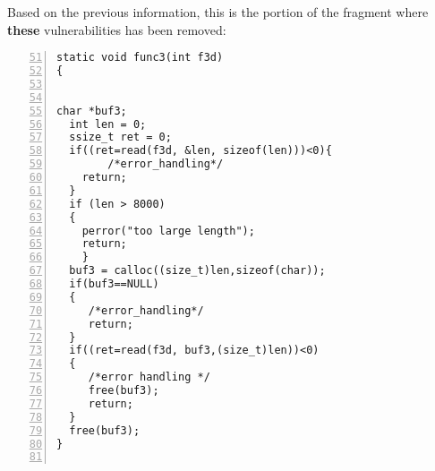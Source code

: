 \documentclass[a4paper,12pt]{article}
\begin{document}
\newpage
\noindent
Based on the previous information, this is the portion of the fragment where \textbf{these} vulnerabilities has been removed:
\begin{lstlisting}[style=c,numbers=left,firstnumber=51,linebackgroundcolor={
\ifnum\value{lstnumber}=56\color{green}\fi
\ifnum\value{lstnumber}=66\color{green}\fi}]
static void func3(int f3d)
{
	

char *buf3;
  int len = 0;
  ssize_t ret = 0;
  if((ret=read(f3d, &len, sizeof(len)))<0){
        /*error_handling*/
	return;
  }
  if (len > 8000) 
  { 
  	perror("too large length");
  	return; 
	}
  buf3 = calloc((size_t)len,sizeof(char));
  if(buf3==NULL)
  {
     /*error_handling*/
     return;
  }
  if((ret=read(f3d, buf3,(size_t)len))<0)
  {
     /*error handling */
     free(buf3);
     return;
  }
  free(buf3);        
}


\end{lstlisting}
\end{document}
